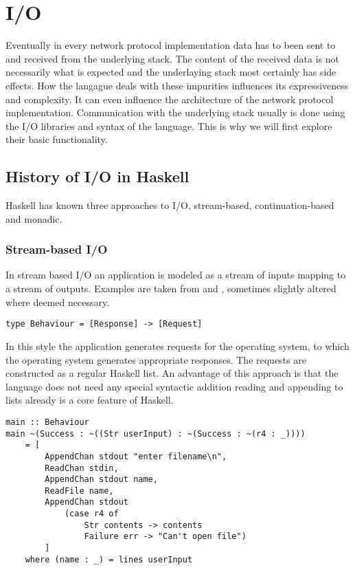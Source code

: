 \chapter{I/O}
Eventually in every network protocol implementation data has to been sent to and received from the underlying stack.
The content of the received data is not necessarily what is expected and the underlaying stack most certainly has side effects.
How the langague deals with these impurities influences its expressiveness and complexity.
It can even influence the architecture of the network protocol implementation.
Communication with the underlying stack usually is done using the I/O libraries and syntax of the language.
This is why we will first explore their basic functionality.
\section{History of I/O in Haskell}
Haskell has known three approaches to I/O, stream-based, continuation-based and monadic.
\subsection{Stream-based I/O}
In stream based I/O an application is modeled as a stream of inputs mapping to a stream of outputs. Examples are taken from \cite{hudak_history_2007} and \cite{hudak_conception_1989}, sometimes slightly altered where deemed necessary.

\begin{lstlisting}[caption={Mapping of responses to requests}]
type Behaviour = [Response] -> [Request]
\end{lstlisting}

In this style the application generates requests for the operating system, to which the operating system generates appropriate responses. The requests are constructed as a regular Haskell list. An advantage of this approach is that the language does not need any special syntactic addition reading and appending to lists already is a core feature of Haskell.

\begin{lstlisting}[caption={Example of stream-based I/O in Haskell}]
main :: Behaviour
main ~(Success : ~((Str userInput) : ~(Success : ~(r4 : _))))
	= [
		AppendChan stdout "enter filename\n",
		ReadChan stdin,
		AppendChan stdout name,
		ReadFile name,
		AppendChan stdout
			(case r4 of
				Str contents -> contents
				Failure err -> "Can't open file")
		]
	where (name : _) = lines userInput
\end{lstlisting}

